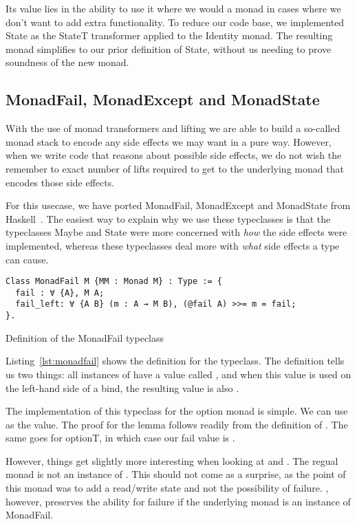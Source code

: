 Its value lies in the
ability to use it where we would a monad in cases where we don't want to add
extra functionality. To reduce our code base, we implemented State as the
StateT transformer applied to the Identity monad. The resulting monad
simplifies to our prior definition of State, without us needing to prove
soundness of the new monad.

\subsection{MonadFail, MonadExcept and MonadState}
With the use of monad transformers and lifting we are able to build a so-called 
monad stack to encode any side effects we may want in a pure way. However, when
we write code that reasons about possible side effects, we do not wish the
remember to exact number of lifts required to get to the underlying monad that
encodes those side effects. 

For this usecase, we have ported MonadFail, MonadExcept and MonadState from
Haskell~\cite{gibbons2011just}. The easiest way to explain why we use these typeclasses is that 
the typeclasses Maybe and State were more concerned with
\textit{how} the side effects were implemented, whereas these typeclasses deal 
more with \textit{what} side effects a type can cause.

\begin{listing}
\begin{verbatim}
Class MonadFail M {MM : Monad M} : Type := {
  fail : ∀ {A}, M A;
  fail_left: ∀ {A B} (m : A → M B), (@fail A) >>= m = fail;
}.
\end{verbatim}
\caption{Definition of the MonadFail typeclass}
\label{lst:monadfail}
\end{listing}

Listing~\ref{lst:monadfail} shows the definition for the  typeclass.
The definition tells us two things: all instances of  have a value
called , and when this value is used on the left-hand side of a bind, the
resulting value is also .

The implementation of this typeclass for the option monad is simple. We can use
 as the  value. 
The proof for the  lemma follows readily from
the definition of . The same goes for optionT, in which case 
our fail value is .

However, things get slightly more interesting when looking at  and
.
The regual  monad is not an instance of . 
This should not come as
a surprise, as the point of this monad was to add a read/write state and not
the possibility of failure. , however, preserves the ability for failure
if the underlying monad is an instance of MonadFail.

